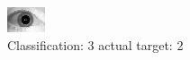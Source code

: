 \begin{figure}[h!]
\begin{center}
\includegraphics[width=0.60\columnwidth]{figures/ID1728_class_3_target_2.png}
\end{center}
\caption{ Classification: 3 actual target: 2}
\label{fig:ID1728_class_3_target_2}
\end{figure}
